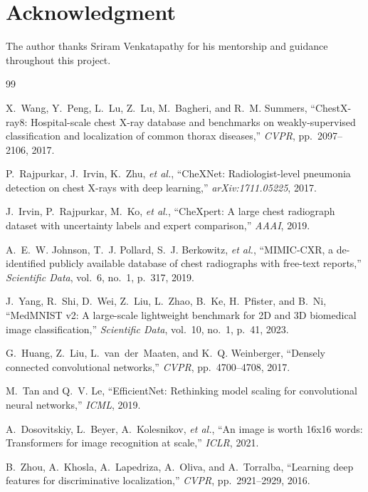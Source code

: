 \documentclass[conference]{IEEEtran}
\begin{document}
\section*{Acknowledgment}
The author thanks Sriram Venkatapathy for his mentorship and guidance throughout
this project.

\begin{thebibliography}{99}
\footnotesize
\setlength{\itemsep}{0pt}

X.~Wang, Y.~Peng, L.~Lu, Z.~Lu, M.~Bagheri, and R.~M. Summers,
``ChestX-ray8: Hospital-scale chest X-ray database and benchmarks on
weakly-supervised classification and localization of common thorax diseases,''
\emph{CVPR}, pp.~2097--2106, 2017.

P.~Rajpurkar, J.~Irvin, K.~Zhu, \emph{et al.},
``CheXNet: Radiologist-level pneumonia detection on chest X-rays with deep
learning,'' \emph{arXiv:1711.05225}, 2017.

J.~Irvin, P.~Rajpurkar, M.~Ko, \emph{et al.},
``CheXpert: A large chest radiograph dataset with uncertainty labels and expert
comparison,'' \emph{AAAI}, 2019.

A.~E.~W. Johnson, T.~J. Pollard, S.~J. Berkowitz, \emph{et al.},
``MIMIC-CXR, a de-identified publicly available database of chest radiographs with
free-text reports,'' \emph{Scientific Data}, vol.~6, no.~1, p.~317, 2019.

J.~Yang, R.~Shi, D.~Wei, Z.~Liu, L.~Zhao, B.~Ke, H.~Pfister, and B.~Ni,
``MedMNIST v2: A large-scale lightweight benchmark for 2D and 3D biomedical image
classification,'' \emph{Scientific Data}, vol.~10, no.~1, p.~41, 2023.

G.~Huang, Z.~Liu, L.~van~der~Maaten, and K.~Q. Weinberger,
``Densely connected convolutional networks,'' \emph{CVPR}, pp.~4700--4708, 2017.

M.~Tan and Q.~V. Le,
``EfficientNet: Rethinking model scaling for convolutional neural networks,''
\emph{ICML}, 2019.

A.~Dosovitskiy, L.~Beyer, A.~Kolesnikov, \emph{et al.},
``An image is worth 16x16 words: Transformers for image recognition at scale,''
\emph{ICLR}, 2021.

B.~Zhou, A.~Khosla, A.~Lapedriza, A.~Oliva, and A.~Torralba,
``Learning deep features for discriminative localization,'' \emph{CVPR},
pp.~2921--2929, 2016.


\end{thebibliography}
\end{document}
